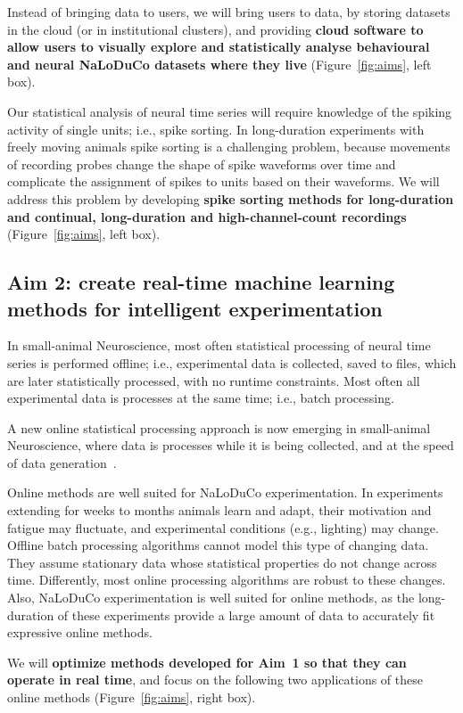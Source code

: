 \documentclass[12pt]{article}
\begin{document}
Instead of bringing data to users, we will bring users to data, by storing
datasets in the cloud (or in institutional clusters), and providing
\textbf{cloud software to allow users to visually explore and statistically
analyse behavioural and neural NaLoDuCo datasets where they live}
(Figure~\ref{fig:aims}, left box).

Our statistical analysis of neural time series will require knowledge of the
spiking activity of single units; i.e., spike sorting. In long-duration
experiments with freely moving animals spike sorting is a challenging problem,
because movements of recording probes change the shape of spike waveforms over
time and complicate the assignment of spikes to units based on their waveforms.
We will address this problem by developing \textbf{spike sorting methods for
long-duration and continual, long-duration and high-channel-count recordings}
(Figure~\ref{fig:aims}, left box).

\subsection*{Aim 2: create real-time machine learning methods for intelligent
experimentation}

In small-animal Neuroscience, most often statistical processing of neural time series is
performed offline;
i.e., experimental data is collected, saved to files, which are later
statistically processed, with no runtime constraints. Most often all
experimental data is processes at the same time; i.e., batch processing.

A new online statistical processing approach is now emerging in small-animal Neuroscience,
where data is processes while it is being collected, and at the speed of data
generation~\citep{vermaniEtAl24}.

Online methods are well suited for NaLoDuCo experimentation. In experiments
extending for weeks to months animals learn and adapt, their motivation and
fatigue may fluctuate, and experimental conditions (e.g., lighting) may change.
Offline batch processing algorithms cannot model this type of changing data.
They assume stationary data whose statistical properties do not change across
time. Differently, most online processing algorithms are robust to
these changes.
%
Also, NaLoDuCo experimentation is well suited for online methods, as the
long-duration of these experiments provide a large amount of data to accurately
fit expressive online methods.

We will \textbf{optimize methods developed for Aim~1 so that they can operate
in real time}, and focus on the following two applications of these online
methods (Figure~\ref{fig:aims}, right box).
\end{document}
